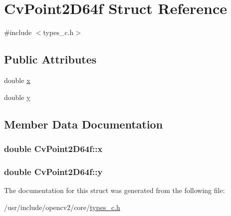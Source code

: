\hypertarget{structCvPoint2D64f}{\section{Cv\-Point2\-D64f Struct Reference}
\label{structCvPoint2D64f}
}


{\ttfamily \#include $<$types\-\_\-c.\-h$>$}

\subsection*{Public Attributes}
\begin{DoxyCompactItemize}
\item 
double \hyperlink{structCvPoint2D64f_a02fda59aa4280086833a6f81b24bd299}{x}
\item 
double \hyperlink{structCvPoint2D64f_a69f2e60120960128997b59dabd1c1687}{y}
\end{DoxyCompactItemize}


\subsection{Member Data Documentation}
\hypertarget{structCvPoint2D64f_a02fda59aa4280086833a6f81b24bd299}{
\subsubsection[{x}]{\setlength{\rightskip}{0pt plus 5cm}double Cv\-Point2\-D64f\-::x}}\label{structCvPoint2D64f_a02fda59aa4280086833a6f81b24bd299}
\hypertarget{structCvPoint2D64f_a69f2e60120960128997b59dabd1c1687}{
\subsubsection[{y}]{\setlength{\rightskip}{0pt plus 5cm}double Cv\-Point2\-D64f\-::y}}\label{structCvPoint2D64f_a69f2e60120960128997b59dabd1c1687}


The documentation for this struct was generated from the following file\-:\begin{DoxyCompactItemize}
\item 
/usr/include/opencv2/core/\hyperlink{core_2types__c_8h}{types\-\_\-c.\-h}\end{DoxyCompactItemize}
